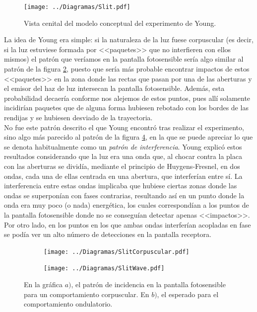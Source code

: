 \documentclass[11pt, spanish]{report}
\numberwithin{equation}{section}
\numberwithin{defin}{section}
\begin{document}
\begin{figure}[h]
\begin{center}
\texttt{[image: ../Diagramas/Slit.pdf]}
\end{center}
\caption{Vista cenital del modelo conceptual del experimento de Young.}\label{YoungExp}
\end{figure}

La idea de Young era simple: si la naturaleza de la luz fuese corpuscular (es decir, si la luz estuviese formada por <<paquetes>> que no interfieren con ellos mismos) el patrón que veríamos en la pantalla fotosensible sería algo similar al patrón de la figura \ref{InterferenciaCorpuscular}, puesto que sería más probable encontrar impactos de estos <<paquetes>> en la zona donde las rectas que pasan por una de las aberturas y el emisor del haz de luz intersecan la pantalla fotosensible. Además, esta probabilidad decaería conforme nos alejemos de estos puntos, pues allí solamente incidirían paquetes que de alguna forma hubiesen rebotado con los bordes de las rendijas y se hubiesen desviado de la trayectoria.\\

No fue este patrón descrito el que Young encontró tras realizar el experimento, sino algo más parecido al patrón de la figura \ref{InterferenciaOndulatoria}, en la que se puede apreciar lo que se denota habitualmente como un \textit{patrón de interferencia}. Young explicó estos resultados considerando que la luz era una onda que, al chocar contra la placa con las aberturas se dividía, mediante el principio de Huygens-Fresnel, en dos ondas, cada una de ellas centrada en una abertura, que interferían entre sí. La interferencia entre estas ondas implicaba que hubiese ciertas zonas donde las ondas se superponían con fases contrarias, resultando así en un punto donde la onda era muy poco (o nada) energética, los cuales correspondían a los puntos de la pantalla fotosensible donde no se conseguían detectar apenas <<impactos>>. Por otro lado, en los puntos en los que ambas ondas interferían acopladas en fase se podía ver un alto número de detecciones en la pantalla receptora.\\

\begin{figure}[h]
\centering
\begin{subfigure}{.5\textwidth}
  \centering
  \texttt{[image: ../Diagramas/SlitCorpuscular.pdf]}
  \caption{}\label{InterferenciaCorpuscular}
\end{subfigure}%
\begin{subfigure}{.5\textwidth}
  \centering
  \texttt{[image: ../Diagramas/SlitWave.pdf]}
  \caption{}\label{InterferenciaOndulatoria}
\end{subfigure}
\caption{En la gráfica $a)$, el patrón de incidencia en la pantalla fotosensible para un comportamiento corpuscular. En $b)$, el esperado para el comportamiento ondulatorio.}
\end{figure}
\end{document}
